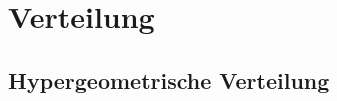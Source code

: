 \documentclass{school}
\begin{document}
\newpage
\section{Verteilung}
\subsection{Hypergeometrische Verteilung}




\end{document}
